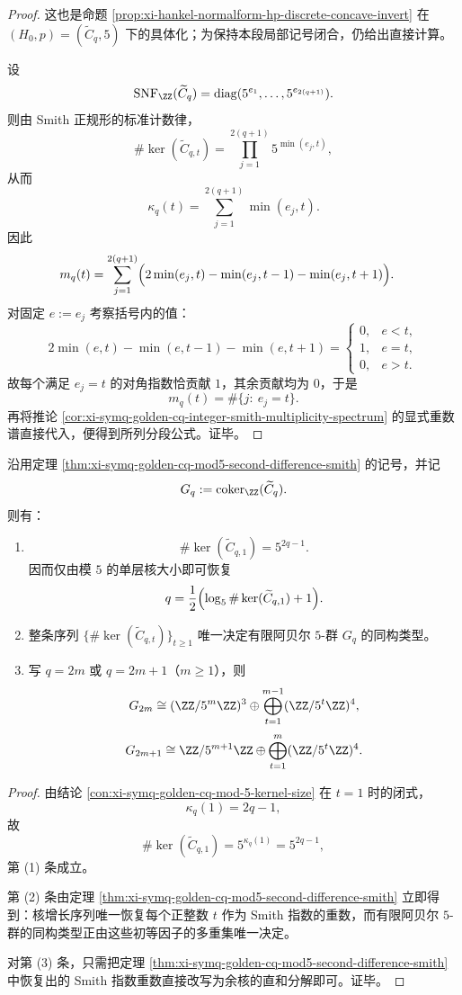 \begin{proof}
这也是命题 \ref{prop:xi-hankel-normalform-hp-discrete-concave-invert} 在 \((H_0,p)=(\widetilde C_q,5)\) 下的具体化；为保持本段局部记号闭合，仍给出直接计算。

设
\[
\mathrm{SNF}_{\ZZ}(\widetilde C_q)
=
\operatorname{diag}(5^{e_1},\dots,5^{e_{2(q+1)}}).
\]
则由 Smith 正规形的标准计数律，
\[
\#\ker(\widetilde C_{q,t})
=
\prod_{j=1}^{2(q+1)}5^{\min(e_j,t)},
\]
从而
\[
\kappa_q(t)=\sum_{j=1}^{2(q+1)}\min(e_j,t).
\]
因此
\[
\begin{aligned}
m_q(t)
&=
\sum_{j=1}^{2(q+1)}\Bigl(2\min(e_j,t)-\min(e_j,t-1)-\min(e_j,t+1)\Bigr).
\end{aligned}
\]
对固定 \(e:=e_j\) 考察括号内的值：
\[
2\min(e,t)-\min(e,t-1)-\min(e,t+1)
=
\begin{cases}
0,& e<t,\\
1,& e=t,\\
0,& e>t.
\end{cases}
\]
故每个满足 \(e_j=t\) 的对角指数恰贡献 \(1\)，其余贡献均为 \(0\)，于是
\[
m_q(t)=\#\{j:\ e_j=t\}.
\]
再将推论 \ref{cor:xi-symq-golden-cq-integer-smith-multiplicity-spectrum} 的显式重数谱直接代入，便得到所列分段公式。证毕。
\end{proof}

\begin{corollary}\label{cor:xi-symq-golden-cq-mod5-single-layer-rigidity}
沿用定理 \ref{thm:xi-symq-golden-cq-mod5-second-difference-smith} 的记号，并记
\[
G_q:=\mathrm{coker}_{\ZZ}(\widetilde C_q).
\]
则有：
\begin{enumerate}
  \item
  \[
  \#\ker(\widetilde C_{q,1})=5^{2q-1}.
  \]
  因而仅由模 \(5\) 的单层核大小即可恢复
  \[
  q=\frac{1}{2}\Bigl(\log_5\#\ker(\widetilde C_{q,1})+1\Bigr).
  \]
  \item 整条序列
  \(
  \{\#\ker(\widetilde C_{q,t})\}_{t\ge 1}
  \)
  唯一决定有限阿贝尔 \(5\)-群 \(G_q\) 的同构类型。
  \item 写 \(q=2m\) 或 \(q=2m+1\)（\(m\ge 1\)），则
  \[
  G_{2m}\cong (\ZZ/5^m\ZZ)^3\oplus \bigoplus_{t=1}^{m-1}(\ZZ/5^t\ZZ)^4,
  \]
  \[
  G_{2m+1}\cong \ZZ/5^{m+1}\ZZ\oplus \bigoplus_{t=1}^{m}(\ZZ/5^t\ZZ)^4.
  \]
\end{enumerate}
\end{corollary}
\begin{proof}
由结论 \ref{con:xi-symq-golden-cq-mod-5-kernel-size} 在 \(t=1\) 时的闭式，
\[
\kappa_q(1)=2q-1,
\]
故
\[
\#\ker(\widetilde C_{q,1})=5^{\kappa_q(1)}=5^{2q-1},
\]
第 (1) 条成立。

第 (2) 条由定理 \ref{thm:xi-symq-golden-cq-mod5-second-difference-smith} 立即得到：核增长序列唯一恢复每个正整数 \(t\) 作为 Smith 指数的重数，而有限阿贝尔 \(5\)-群的同构类型正由这些初等因子的多重集唯一决定。

对第 (3) 条，只需把定理 \ref{thm:xi-symq-golden-cq-mod5-second-difference-smith} 中恢复出的 Smith 指数重数直接改写为余核的直和分解即可。证毕。
\end{proof}

